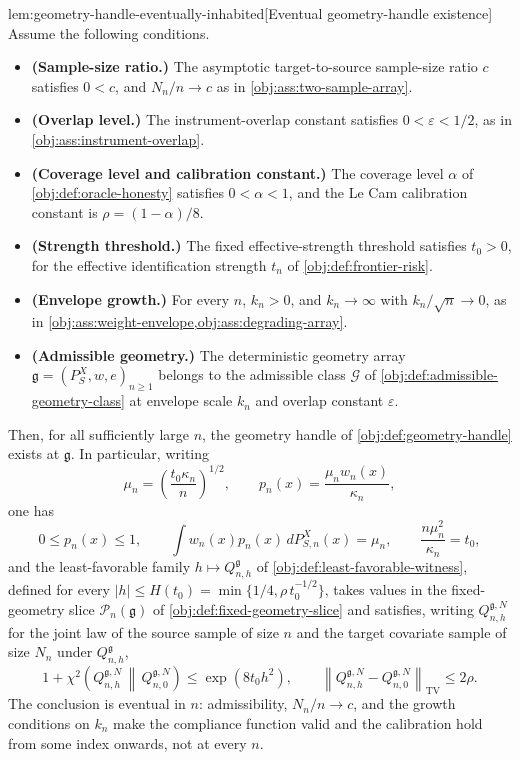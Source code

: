 \documentclass[11pt]{article}
\begin{document}
\begin{lemmav}{lem:geometry-handle-eventually-inhabited}[Eventual geometry-handle existence]
Assume the following conditions.
\begin{itemize}
\item \textbf{(Sample-size ratio.)} The asymptotic target-to-source sample-size ratio \(c\) satisfies \(0<c\), and \(N_n/n\to c\) as in \cref{obj:ass:two-sample-array}.
\item \textbf{(Overlap level.)} The instrument-overlap constant satisfies \(0<\varepsilon<1/2\), as in \cref{obj:ass:instrument-overlap}.
\item \textbf{(Coverage level and calibration constant.)} The coverage level \(\alpha\) of \cref{obj:def:oracle-honesty} satisfies \(0<\alpha<1\), and the Le Cam calibration constant is \(\rho=(1-\alpha)/8\).
\item \textbf{(Strength threshold.)} The fixed effective-strength threshold satisfies \(t_0>0\), for the effective identification strength \(t_n\) of \cref{obj:def:frontier-risk}.
\item \textbf{(Envelope growth.)} For every \(n\), \(k_n>0\), and \(k_n\to\infty\) with \(k_n/\sqrt n\to0\), as in \cref{obj:ass:weight-envelope,obj:ass:degrading-array}.
\item \textbf{(Admissible geometry.)} The deterministic geometry array \(\mathfrak g=(P_S^X,w,e)_{n\ge1}\) belongs to the admissible class \(\mathcal G\) of \cref{obj:def:admissible-geometry-class} at envelope scale \(k_n\) and overlap constant \(\varepsilon\).
\end{itemize}
Then, for all sufficiently large \(n\), the geometry handle of \cref{obj:def:geometry-handle} exists at \(\mathfrak g\). In particular, writing
\[
\mu_n=\left(\frac{t_0\kappa_n}{n}\right)^{1/2},
\qquad
p_n(x)=\frac{\mu_n w_n(x)}{\kappa_n},
\]
one has
\[
0\le p_n(x)\le1,
\qquad
\int w_n(x)p_n(x)\,dP_{S,n}^X(x)=\mu_n,
\qquad
\frac{n\mu_n^2}{\kappa_n}=t_0,
\]
and the least-favorable family \(h\mapsto Q_{n,h}^{\mathfrak g}\) of \cref{obj:def:least-favorable-witness}, defined for every \(|h|\le H(t_0)=\min\{1/4,\rho\,t_0^{-1/2}\}\), takes values in the fixed-geometry slice \(\mathcal P_n(\mathfrak g)\) of \cref{obj:def:fixed-geometry-slice} and satisfies, writing \(Q_{n,h}^{\mathfrak g,N}\) for the joint law of the source sample of size \(n\) and the target covariate sample of size \(N_n\) under \(Q_{n,h}^{\mathfrak g}\),
\[
1+\chi^2\!\left(Q_{n,h}^{\mathfrak g,N}\,\middle\|\,Q_{n,0}^{\mathfrak g,N}\right)\le\exp(8t_0h^2),
\qquad
\left\|Q_{n,h}^{\mathfrak g,N}-Q_{n,0}^{\mathfrak g,N}\right\|_{\mathrm{TV}}\le2\rho .
\]
The conclusion is eventual in \(n\): admissibility, \(N_n/n\to c\), and the growth conditions on \(k_n\) make the compliance function valid and the calibration hold from some index onwards, not at every \(n\).
\end{lemmav}
\end{document}
